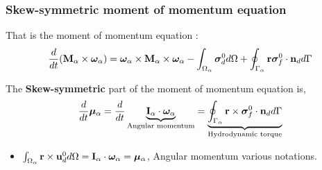 \documentclass{sintefbeamer}
\begin{document}
\begin{frame}
  \frametitle{Skew-symmetric moment of momentum  equation }
  That is the moment of momentum equation :
\begin{equation*}
  \frac{d}{dt} (\textbf{M}_\alpha \times \bm\omega_\alpha)
  = \bm\omega_\alpha\times \textbf{M}_\alpha\times \bm\omega_\alpha
  - \int_{\Omega_{\alpha}} \bm{\sigma}_d^0  d\Omega
  + \oint_{\Gamma_{\alpha}}  \textbf{r}\bm{\sigma}_f^0\cdot \textbf{n}_d d\Gamma
\end{equation*}

The \textbf{Skew-symmetric} part of the moment of momentum equation is,  
\begin{equation*}
  \frac{d}{dt} \bm\mu_\alpha
  = 
  \frac{d}{dt} \underbrace{\textbf{I}_\alpha \cdot \bm\omega_\alpha}_\text{Angular momentum}
  = 
  \underbrace{\oint_{\Gamma_{\alpha}}  \textbf{r} \times \bm{\sigma}_f^0\cdot \textbf{n}_d d\Gamma}_\text{Hydrodynamic torque}
\end{equation*}
\begin{definition}
  \begin{itemize}
    \item  $\int_{\Omega_{\alpha}} \textbf{r} \times \textbf{u}_d^0 d\Omega = \textbf{I}_\alpha \cdot \bm\omega_\alpha = \bm\mu_\alpha$, Angular momentum various notations. 
  \end{itemize}
\end{definition}
\end{frame}
\end{document}
